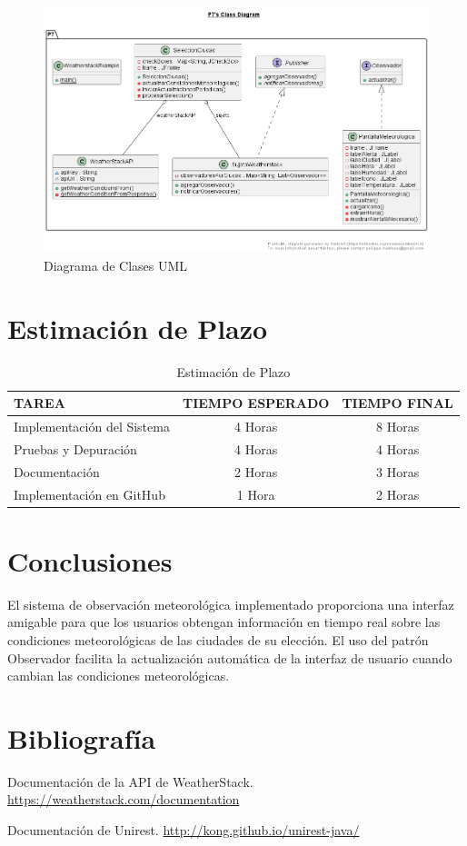 \documentclass{article}
\begin{document}
\begin{figure}[H]
    \centering
    \includegraphics[width=1.0\textwidth]{Diagrama_clases.png}
    \caption{Diagrama de Clases UML}
    \label{fig:diagrama_clases}
\end{figure}

\section{Estimación de Plazo}

\begin{table}[H]
    \centering
    \begin{tabular}{|l|c|c|}
        \hline
        \textbf{TAREA} & \textbf{TIEMPO ESPERADO} & \textbf{TIEMPO FINAL} \\
        \hline
        Implementación del Sistema & 4 Horas & 8 Horas \\
        Pruebas y Depuración & 4 Horas & 4 Horas \\
        Documentación & 2 Horas & 3 Horas \\
        Implementación en GitHub & 1 Hora & 2 Horas \\
        \hline
    \end{tabular}
    \caption{Estimación de Plazo}
    \label{tab:estimacion_plazo}
\end{table}

\section{Conclusiones}
El sistema de observación meteorológica implementado proporciona una interfaz amigable para que los usuarios obtengan información en tiempo real sobre las condiciones meteorológicas de las ciudades de su elección. El uso del patrón Observador facilita la actualización automática de la interfaz de usuario cuando cambian las condiciones meteorológicas.

\section{Bibliografía}
\begin{thebibliography}{99}
    Documentación de la API de WeatherStack. \url{https://weatherstack.com/documentation}

    Documentación de Unirest. \url{http://kong.github.io/unirest-java/}
\end{thebibliography}
\end{document}
